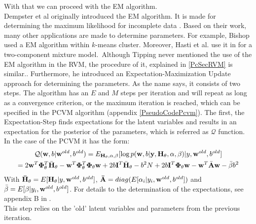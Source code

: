 With that we can proceed with the \acs{EM} algorithm.\cite{Chen.2009}\\
Dempster et al originally introduced the EM algorithm. It is made for determining the maximum likelihood for incomplete data \cite{Dempster.1977}. 
Based on their work, many other applications are made to determine parameters.
For example, Bishop used a \acs{EM} algorithm within $k$-means cluster.\cite[p. 426-428]{Bishop.2009}
Moreover, Hasti et al. use it in \cite[p. 272-276]{TrevorHastie.2009} for a two-component mixture model.\
Although Tipping never mentioned the use of the \acs{EM} algorithm in the \acs{RVM}, the procedure of it, explained in \ref{PcSecRVM} is similar.\cite[p. 233-234]{Tipping.2001}.
Furthermore, he introduced an Expectation-Maximization Update approach for determining the parameters.\cite[p. 235]{Tipping.2001} \newline
As the name says, it consists of two steps.
The algorithm has an $E$ and $M$ steps per iteration and will repeat as long as a convergence criterion, or the maximum iteration is reached, which can be specified in the \acs{PCVM} algorithm (appendix \ref{PseudoCodePcvm}).
The first, the Expectation-Step finds expectations for the latent variables and results in an expectation for the posterior of the parameters, which is referred as $\mathcal{Q}$ function.
In the case of the \acs{PCVM} it has the form:\cite{Chen.2009}
\begin{equation}\label{EqPcvmEStep}
\begin{gathered}
\mathcal{Q}(\mathbf{w},b\vert \mathbf{w}^{old},b^{old}) = E_{\mathbf{H}_{\theta},\alpha,\beta}[\log p (\mathbf{w},b \vert \mathbf{y} ,\mathbf{H}_{\theta},\alpha,\beta) | y,\mathbf{w}^{old},b^{old}]\\
= 2\mathbf{w}^T \mathbf{\Phi}_{\theta}^T \bar{\mathbf{H}}_\theta - \mathbf{w}^T \mathbf{\Phi}_{\theta}^T  \mathbf{\Phi}_{\theta} \mathbf{w} + 2b\mathbf{I}^T \bar{\mathbf{H}}_{\theta} -  b^2N + 2b\mathbf{I}^T \mathbf{\Phi}_\theta \mathbf{w}- \mathbf{w}^T\bar{\mathbf{A}}\mathbf{w} - \bar{\beta}b^2
\end{gathered}
\end{equation}
With $\mathbf{\bar{H}}_\theta =  E[\mathbf{H}_\theta \vert y, \mathbf{w}^{old}, b^{old}]$, $\mathbf{\bar{A}} = diag(E[\alpha_i|y_i,\mathbf{w}^{old},b^{old}])$ and $\bar{\beta}=E[\beta\vert y_i,\mathbf{w}^{old},b^{old}]$.
For details to the determination of the expectations, see appendix B in \cite{Chen.2009}.\\
This step relies on the 'old' latent variables and parameters from the previous iteration.
